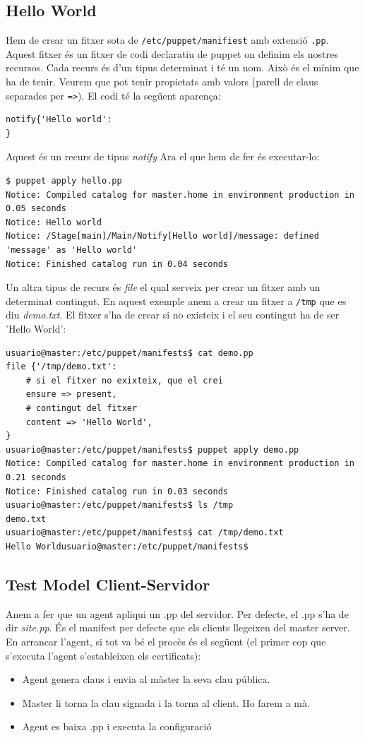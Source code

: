 \documentclass[a4paper]{article}
\begin{document}
\subsection{Hello World}
Hem de crear un fitxer sota de \verb+/etc/puppet/manifiest+ amb extensió \verb+.pp+. Aquest fitxer \'es un fitxer de codi declaratiu de puppet on definim els nostres recursos. Cada recurs \'es d'un tipus determinat i t\'e un nom. Això \'es el mínim que ha de tenir. Veurem que pot tenir propietats amb valors (parell de claus separades per \verb+=>+). El codi t\'e la següent aparença:
\begin{verbatim}
notify{'Hello world':
}
\end{verbatim}
Aquest \'es un recurs de tipus \textit{notify} Ara el que hem de fer \'es executar-lo:
\begin{verbatim}
$ puppet apply hello.pp
Notice: Compiled catalog for master.home in environment production in 0.05 seconds
Notice: Hello world
Notice: /Stage[main]/Main/Notify[Hello world]/message: defined 'message' as 'Hello world'
Notice: Finished catalog run in 0.04 seconds
\end{verbatim}
Un altra tipus de recurs \'es \textit{file} el qual serveix per crear un fitxer amb un determinat contingut. En aquest exemple anem a crear un fitxer a \verb+/tmp+ que es diu \textit{demo.txt}. El fitxer s'ha de crear si no existeix i el seu contingut ha de ser 'Hello World':
\begin{verbatim}
usuario@master:/etc/puppet/manifests$ cat demo.pp 
file {'/tmp/demo.txt':
    # si el fitxer no exixteix, que el crei
    ensure => present,
    # contingut del fitxer
    content => 'Hello World',
}
usuario@master:/etc/puppet/manifests$ puppet apply demo.pp 
Notice: Compiled catalog for master.home in environment production in 0.21 seconds
Notice: Finished catalog run in 0.03 seconds
usuario@master:/etc/puppet/manifests$ ls /tmp
demo.txt
usuario@master:/etc/puppet/manifests$ cat /tmp/demo.txt 
Hello Worldusuario@master:/etc/puppet/manifests$ 
\end{verbatim}

\subsection{Test Model Client-Servidor}
Anem a fer que un agent apliqui un .pp del servidor. Per defecte, el .pp s'ha de dir \textit{site.pp}. És el manifest per defecte que els clients llegeixen del master server. En arrancar l'agent, si tot va b\'e el procès \'es el següent (el primer cop que s'executa l'agent s'estableixen els certificats):
\begin{itemize}
	\item Agent genera claus i envia al màster la seva clau pública.
	\item Master li torna la clau signada i la torna al client. Ho farem a mà.
	\item Agent es baixa .pp i executa la configuració
\end{itemize}
\end{document}
